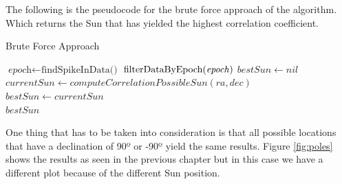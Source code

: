 The following is the pseudocode for the brute force approach of the algorithm. Which returns the Sun that has yielded the highest correlation coefficient.

\begin{algorithm}
	\caption{Brute Force Approach}\label{pseudocodeBruteForce}
	\begin{algorithmic}[1]
		\State $\textit{epoch} \gets \text{findSpikeInData()}$ 
		\State $\text{filterDataByEpoch(\textit{epoch})}$
		\State $bestSun \gets nil$
		\State $currentSun \gets computeCorrelationPossibleSun(ra, dec)$
		\State $bestSun \gets currentSun$
		\EndIf
		\EndFor
		\EndFor
		\\
		\Return $bestSun$
		\EndProcedure
	\end{algorithmic}
\end{algorithm}

\clearpage

One thing that has to be taken into consideration is that all possible locations that have a declination of 90º or -90º yield the same results. Figure \ref{fig:poles} shows the results as seen in the previous chapter but in this case we have a different plot because of the different Sun position. 

